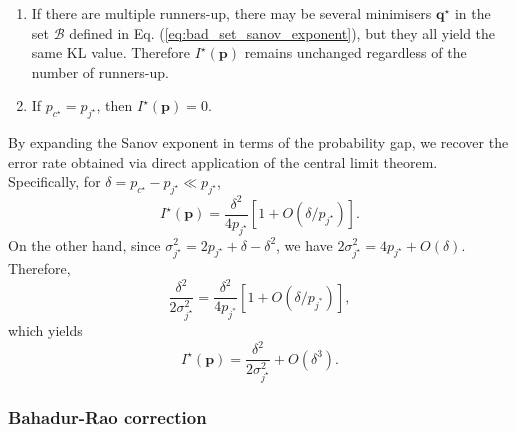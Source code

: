 \begin{remark}
\leavevmode
\begin{enumerate}
\item If there are multiple runners-up, there may be several minimisers $\mathbf q^\star$ in the set $\mathcal{B}$ defined in Eq. (\ref{eq:bad_set_sanov_exponent}), but they all yield the same KL value. Therefore $I^\star(\mathbf{p})$ remains unchanged regardless of the number of runners-up.
\item If $p_{c^\star} = p_{j^\star}$, then $I^\star(\mathbf{p}) = 0$.
\end{enumerate}
\end{remark}
\vspace{8pt}
\begin{remark}
By expanding the Sanov exponent in terms of the probability gap, we recover the error rate obtained via direct application of the central limit theorem. Specifically, for $\delta = p_{c^\star} - p_{j^\star} \ll p_{j^\star}$,
$$
I^\star(\mathbf{p}) = \frac{\delta^2}{4 p_{j^\star}}\left[1 + O(\delta/p_{j^\star})\right].
$$
On the other hand, since $\sigma_{j^\star}^2 = 2p_{j^\star} + \delta - \delta^2$, we have $
2 \sigma_{j^\star}^2 = 4 p_{j^\star} + O(\delta).
$
Therefore,
$$
\frac{\delta^2}{2\sigma_{j^\star}^2} = \frac{\delta^2}{4p_{j^*}}[1 + O(\delta/p_{j^*})],
$$
which yields
$$
I^\star(\mathbf{p}) = \frac{\delta^2}{2\sigma_{j^\star}^2} + O(\delta^3).
$$
\end{remark}

\subsubsection{Bahadur-Rao correction}




